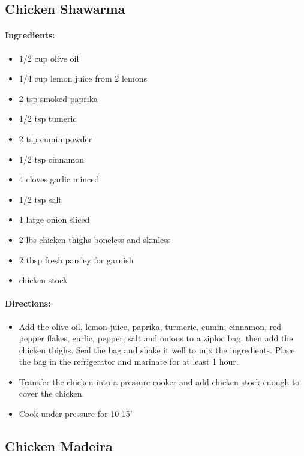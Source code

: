 \documentclass{article}
\begin{document}
\subsection{Chicken Shawarma}

\paragraph{Ingredients:}
\begin{itemize}
    \item 1/2 cup olive oil
    \item 1/4 cup lemon juice from 2 lemons
    \item 2 tsp smoked paprika
    \item 1/2 tsp tumeric
    \item 2 tsp cumin powder
    \item 1/2 tsp cinnamon
    \item 4 cloves garlic minced
    \item 1/2 tsp salt
    \item 1 large onion sliced
    \item 2 lbs chicken thighs boneless and skinless
    \item 2 tbsp fresh parsley for garnish
    \item chicken stock
\end{itemize}

\paragraph{Directions:}
\begin{itemize}
    \item Add the olive oil, lemon juice, paprika, turmeric, cumin, cinnamon, red pepper flakes, garlic, pepper, salt and onions to a ziploc bag, then add the chicken thighs. Seal the bag and shake it well to mix the ingredients. Place the bag in the refrigerator and marinate for at least 1 hour.
    \item Transfer the chicken into a pressure cooker and add chicken stock enough to cover the chicken.
    \item Cook under pressure for 10-15'
\end{itemize}

\subsection{Chicken Madeira}
\end{document}
